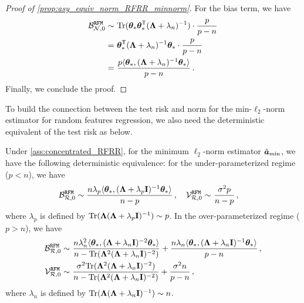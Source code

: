 \begin{proof}[Proof of \cref{prop:asy_equiv_norm_RFRR_minnorm}]
For the bias term, we have
\[
\begin{aligned}
\mathcal{B}_{\mathcal{N},0}^{\tt RFM} \sim&~ {\rm Tr}( {\boldsymbol \theta}_* {\boldsymbol \theta}_*^{\mathsf T} ( {\boldsymbol \Lambda} + \lambda_n)^{-1} ) \cdot \frac{p}{p-n}\\
=&~ {\boldsymbol \theta}_*^{\mathsf T} ( {\boldsymbol \Lambda} + \lambda_n)^{-1} {\boldsymbol \theta}_* \cdot \frac{p}{p-n}\\
=&~ \frac{p\langle{\boldsymbol \theta}_*, ( {\boldsymbol \Lambda} + \lambda_n)^{-1} {\boldsymbol \theta}_*\rangle}{p-n}\,.
\end{aligned}
\]
Finally, we conclude the proof.
\end{proof}

To build the connection between the test risk and norm for the min-$\ell_2$-norm estimator for random features regression, we also need the deterministic equivalent of the test risk as below.

\begin{proposition}\label{prop:asy_equiv_error_RFRR_minnorm}
    Under \cref{ass:concentrated_RFRR}, for the minimum $\ell_2$-norm estimator $\hat{{\boldsymbol a}}_{\min}$, we have the following deterministic equivalence: for the under-parameterized regime ($p<n$), we have
    \[
    \begin{aligned}
        \mathcal{B}^{\tt RFM}_{\mathcal{R},0} \sim \frac{n\lambda_p \langle{\boldsymbol \theta}_*, ({\boldsymbol \Lambda} +\lambda_p{\mathbf I})^{-1} {\boldsymbol \theta}_*\rangle}{n-p}\,,\quad \mathcal{V}^{\tt RFM}_{\mathcal{R},0} \sim&~ \frac{\sigma^2p}{n-p}\,,
    \end{aligned}
    \]
    where $\lambda_p$ is defined by ${\rm Tr}({\boldsymbol \Lambda}({\boldsymbol \Lambda}+\lambda_p{\mathbf I})^{-1}) \sim p$. In the over-parameterized regime ($p>n$), we have
    \[
    \begin{aligned}
        \mathcal{B}^{\tt RFM}_{\mathcal{R},0} \sim&~ \frac{n\lambda_n^2 \langle{\boldsymbol \theta}_*, ( {\boldsymbol \Lambda} + \lambda_n {\mathbf I})^{-2} {\boldsymbol \theta}_*\rangle}{ n - {\rm Tr}({\boldsymbol \Lambda}^2({\boldsymbol \Lambda}+\lambda_n{\mathbf I})^{-2})} + \frac{n\lambda_n \langle{\boldsymbol \theta}_*, ( {\boldsymbol \Lambda} + \lambda_n{\mathbf I})^{-1} {\boldsymbol \theta}_*\rangle}{p-n}\,,\\
        \mathcal{V}^{\tt RFM}_{\mathcal{R},0} \sim&~  \frac{\sigma^2{\rm Tr}({\boldsymbol \Lambda}^2({\boldsymbol \Lambda}+\lambda_n{\mathbf I})^{-2})}{n - {\rm Tr}({\boldsymbol \Lambda}^2({\boldsymbol \Lambda}+\lambda_n{\mathbf I})^{-2})} + \frac{\sigma^2n}{p-n}\,,
    \end{aligned}
    \]
    where $\lambda_n$ is defined by ${\rm Tr}({\boldsymbol \Lambda}({\boldsymbol \Lambda}+\lambda_n{\mathbf I})^{-1}) \sim n$.
\end{proposition}

